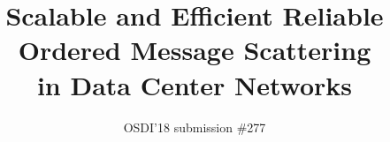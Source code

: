 \documentclass[letterpaper,twocolumn,10pt]{article}
\numberwithin{equation}{section}
\begin{document}
\date{}

\title{ Scalable and Efficient Reliable Ordered Message Scattering\\ in Data Center Networks\vspace{-0.1in}}

\author{{\rm OSDI'18 submission \#277}\vspace{-0.1in}}

\maketitle













{\footnotesize


}


\end{document}
